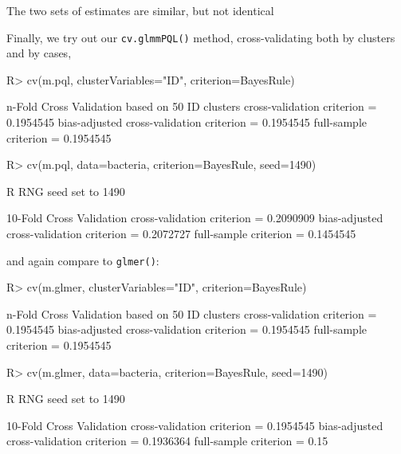 \documentclass[
]{jss}
\begin{document}
The two sets of estimates are similar, but not identical

Finally, we try out our \texttt{cv.glmmPQL()} method, cross-validating
both by clusters and by cases,

\begin{CodeChunk}
\begin{CodeInput}
R> cv(m.pql, clusterVariables="ID", criterion=BayesRule)
\end{CodeInput}
\begin{CodeOutput}
n-Fold Cross Validation based on 50 {ID} clusters
cross-validation criterion = 0.1954545
bias-adjusted cross-validation criterion = 0.1954545
full-sample criterion = 0.1954545 
\end{CodeOutput}
\begin{CodeInput}
R> cv(m.pql, data=bacteria, criterion=BayesRule, seed=1490)
\end{CodeInput}
\begin{CodeOutput}
R RNG seed set to 1490
\end{CodeOutput}
\begin{CodeOutput}
10-Fold Cross Validation
cross-validation criterion = 0.2090909
bias-adjusted cross-validation criterion = 0.2072727
full-sample criterion = 0.1454545 
\end{CodeOutput}
\end{CodeChunk}

and again compare to \texttt{glmer()}:

\begin{CodeChunk}
\begin{CodeInput}
R> cv(m.glmer, clusterVariables="ID", criterion=BayesRule)
\end{CodeInput}
\begin{CodeOutput}
n-Fold Cross Validation based on 50 {ID} clusters
cross-validation criterion = 0.1954545
bias-adjusted cross-validation criterion = 0.1954545
full-sample criterion = 0.1954545 
\end{CodeOutput}
\begin{CodeInput}
R> cv(m.glmer, data=bacteria, criterion=BayesRule, seed=1490)
\end{CodeInput}
\begin{CodeOutput}
R RNG seed set to 1490
\end{CodeOutput}
\begin{CodeOutput}
10-Fold Cross Validation
cross-validation criterion = 0.1954545
bias-adjusted cross-validation criterion = 0.1936364
full-sample criterion = 0.15 
\end{CodeOutput}
\end{CodeChunk}
\end{document}
